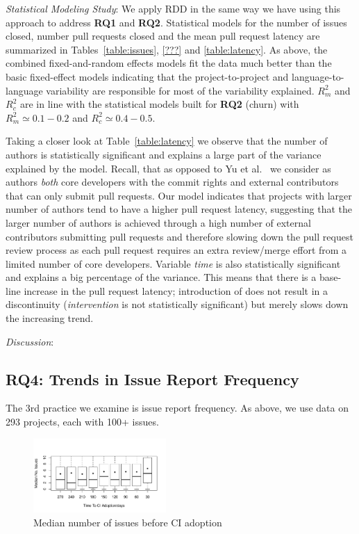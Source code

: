 \smallskip\noindent \emph{Statistical Modeling Study}:
We apply RDD in the same way we have using this approach to address \textbf{RQ1} and \textbf{RQ2}. 
Statistical models for the number of issues closed, number pull requests closed and the mean pull request latency are summarized in Tables~\ref{table:issues}, \ref{???} and \ref{table:latency}.
As above, the combined fixed-and-random effects models fit the data much better than the basic fixed-effect models indicating that the project-to-project and language-to-language variability 
are responsible for most of the variability explained. 
$R^2_m$ and $R^2_c$ are in line with the statistical models built for \textbf{RQ2} (churn) with $R^2_m \simeq 0.1-0.2$ and $R^2_c \simeq 0.4-0.5$.

Taking a closer look at Table~\ref{table:latency} we observe that the number of authors
is statistically significant and explains a large part of the variance explained by the model.
Recall, that as opposed to Yu et al.~\cite{yue2015wait} we consider as authors \emph{both} core developers with the commit rights and external contributors that can only submit pull requests. 
Our model indicates that projects with larger number of authors tend to have a higher pull
request latency, suggesting that the larger number of authors is achieved through a high
number of external contributors submitting pull requests and therefore slowing down the pull request review process as each pull request requires an extra review/merge effort from a limited number of core developers.
Variable \emph{time} is also statistically significant and explains a big percentage of the variance. 
This means that there is a base-line increase in the pull request latency; introduction of \Tvis does not result in a discontinuity (\emph{intervention} is not statistically significant) but merely slows down the increasing trend.



\smallskip\noindent \emph{Discussion}:

\subsection{RQ4: Trends in Issue Report Frequency}

The 3rd practice we examine is issue report frequency.
As above, we use data on 293 projects, each with 
100+ issues.

\begin{figure}[t]
\centering
\includegraphics[width=0.45\textwidth, clip=true, trim=0 15 15 50]{issues_before.pdf}
\caption{Median number of issues before CI adoption}
\label{Fig:IssuesBefore}
\end{figure}


